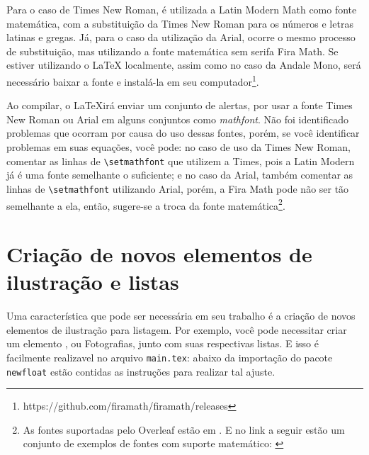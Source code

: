 Para o caso de Times New Roman, é utilizada a Latin Modern Math como fonte matemática, com a substituição da Times New Roman para os números e letras latinas e gregas. Já, para o caso da utilização da Arial, ocorre o mesmo processo de substituição, mas utilizando a fonte matemática sem serifa Fira Math. Se estiver utilizando o \LaTeX{} localmente, assim como no caso da Andale Mono, será necessário baixar a fonte e instalá-la em seu computador\footnote{https://github.com/firamath/firamath/releases}.

Ao compilar, o \LaTeX irá enviar um conjunto de alertas, por usar a fonte Times New Roman ou Arial em alguns conjuntos como \textit{mathfont}. Não foi identificado problemas que ocorram por causa do uso dessas fontes, porém, se você identificar problemas em suas equações, você pode: no caso de uso da Times New Roman, comentar as linhas de \verb|\setmathfont| que utilizem a Times, pois a Latin Modern já é uma fonte semelhante o suficiente; e no caso da Arial, também comentar as linhas de \verb|\setmathfont| utilizando Arial, porém, a Fira Math pode não ser tão semelhante a ela, então, sugere-se a troca da fonte matemática\footnote{As fontes suportadas pelo Overleaf estão em \textcite{site:overleaf-fontes-2023}. E no link a seguir estão um conjunto de exemplos de fontes com suporte matemático: \textcite{site:tex-fontes-2022}}.

\section{Criação de novos elementos de ilustração e listas}\label{section:novos-elementos}
Uma característica que pode ser necessária em seu trabalho é a criação de novos elementos de ilustração para listagem. Por exemplo, você pode necessitar criar um elemento , ou Fotografias, junto com suas respectivas listas. E isso é facilmente realizavel no arquivo \texttt{main.tex}: abaixo da importação do pacote \texttt{newfloat} estão contidas as instruções para realizar tal ajuste.

